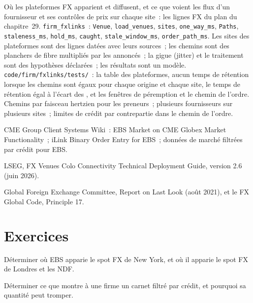 \begin{build}
 Où les plateformes FX apparient et diffusent, et ce que voient les flux d'un fournisseur et ses contrôles de prix sur chaque site~: les lignes FX du
plan du chapitre~29.
 \texttt{firm\_fxlinks}~: \texttt{Venue}, \texttt{load\_venues}, \texttt{sites}, \texttt{one\_way\_ms},
\texttt{Paths}, \texttt{staleness\_ms}, \texttt{hold\_ms}, \texttt{caught}, \texttt{stale\_window\_ms}, \texttt{order\_path\_ms}.
 Les sites des plateformes sont des lignes datées avec leurs sources~; les chemins sont des planchers de fibre multipliés par les  annoncés~; la gigue (jitter) et le traitement sont des
hypothèses déclarées~; les résultats sont un modèle.
 \texttt{code/firm/fxlinks/tests/}~: la table des plateformes, aucun temps de rétention lorsque les chemins sont égaux pour chaque origine et chaque site, le
temps de rétention égal à l'écart des , et les fenêtres de péremption et le chemin de l'ordre.
 Chemins par faisceau hertzien pour les preneurs~; plusieurs fournisseurs sur plusieurs sites~; limites de crédit par contrepartie dans le chemin de l'ordre.
\end{build}

\begin{omsources}
\item CME Group Client Systems Wiki~: EBS Market on CME Globex Market Functionality~; iLink Binary Order Entry for EBS~; données de marché filtrées par crédit
  pour EBS.
\item LSEG, FX Venues Colo Connectivity Technical Deployment Guide, version 2.6 (juin 2026).
\item Global Foreign Exchange Committee, Report on Last Look (août 2021), et le FX Global Code, Principle 17.
\end{omsources}

\section{Exercices}

\begin{exercise}[$\star$]\label{exo:nw:fx-connectivity:1}
Déterminer où EBS apparie le spot FX de New York, et où il apparie le spot FX de Londres et les NDF.
\end{exercise}

\begin{exercise}[$\star$]\label{exo:nw:fx-connectivity:2}
Déterminer ce que montre à une firme un carnet filtré par crédit, et pourquoi sa quantité peut tromper.
\end{exercise}

